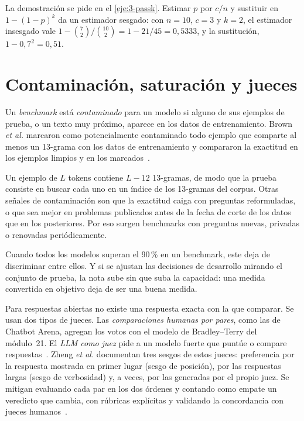 La demostración se pide en el \cref{eje:3-passk}. Estimar $p$ por $c/n$ y sustituir en $1-(1-p)^{k}$ da un estimador sesgado: con $n=10$, $c=3$ y $k=2$, el estimador insesgado vale $1-\binom72/\binom{10}2=1-21/45=0{,}5333$, y la sustitución, $1-0{,}7^{2}=0{,}51$.

\section{Contaminación, saturación y jueces}

\begin{definicion}[Contaminación]\label{def:contaminacion}
Un \emph{benchmark} está \emph{contaminado} para un modelo si alguno de sus ejemplos de prueba, o un texto muy próximo, aparece en los datos de entrenamiento. Brown \emph{et al.} marcaron como potencialmente contaminado todo ejemplo que comparte al menos un 13-grama con los datos de entrenamiento y compararon la exactitud en los ejemplos limpios y en los marcados~\cite[§4]{brown}.
\end{definicion}

Un ejemplo de $L$ tokens contiene $L-12$ 13-gramas, de modo que la prueba consiste en buscar cada uno en un índice de los 13-gramas del corpus. Otras señales de contaminación son que la exactitud caiga con preguntas reformuladas, o que sea mejor en problemas publicados antes de la fecha de corte de los datos que en los posteriores. Por eso surgen benchmarks con preguntas nuevas, privadas o renovadas periódicamente.

\begin{observacion}
Cuando todos los modelos superan el 90\,\% en un benchmark, este deja de discriminar entre ellos. Y si se ajustan las decisiones de desarrollo mirando el conjunto de prueba, la nota sube sin que suba la capacidad: una medida convertida en objetivo deja de ser una buena medida.
\end{observacion}

Para respuestas abiertas no existe una respuesta exacta con la que comparar. Se usan dos tipos de jueces. Las \emph{comparaciones humanas por pares}, como las de Chatbot Arena, agregan los votos con el modelo de Bradley--Terry del módulo~21. El \emph{LLM como juez} pide a un modelo fuerte que puntúe o compare respuestas~\cite{zheng}. Zheng \emph{et al.} documentan tres sesgos de estos jueces: preferencia por la respuesta mostrada en primer lugar (sesgo de posición), por las respuestas largas (sesgo de verbosidad) y, a veces, por las generadas por el propio juez. Se mitigan evaluando cada par en los dos órdenes y contando como empate un veredicto que cambia, con rúbricas explícitas y validando la concordancia con jueces humanos~\cite{zheng}.

